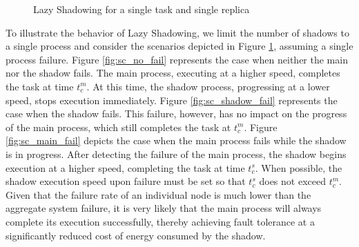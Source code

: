 \begin{figure}[!t]
	\begin{center}
	\end{center}
	\caption{Lazy Shadowing for a single task and single replica}
	\label{fig:sc_overview}
\end{figure}

To illustrate the behavior of Lazy Shadowing, we limit the number of shadows to a single process and consider the scenarios depicted in Figure \ref{fig:sc_overview}, assuming a single process failure. Figure \ref{fig:sc_no_fail} represents the case when neither the main nor the shadow fails. The main process, executing
at a higher speed, completes the task at time $t_c^m$. At this time, the shadow process, progressing at a lower speed, stops execution immediately. Figure \ref{fig:sc_shadow_fail} represents the case when the shadow fails. This failure, however, has no impact on the progress of the main process, which still completes the task at $t_c^m$. Figure \ref{fig:sc_main_fail} depicts the case when the main process fails while the shadow is in progress. After detecting the failure of the main process, the shadow begins execution at a higher speed, completing the task at time $t_c^s$. When possible, the shadow execution speed upon failure must be set so that $t_c^s$ does not exceed $t_c^m$. Given that the failure rate of an individual node is much lower than
the aggregate system failure, it is very likely that the main process
will always complete its execution successfully, thereby achieving fault tolerance at a significantly reduced cost of energy consumed by the shadow. %



